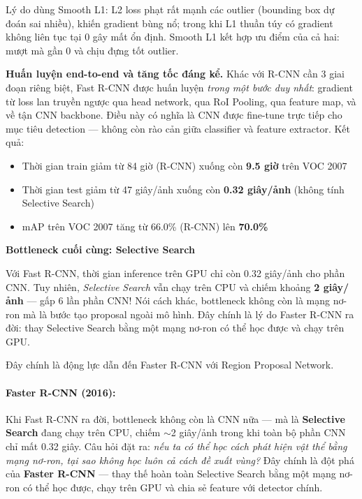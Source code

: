 Lý do dùng Smooth L1: L2 loss phạt rất mạnh các outlier (bounding box dự đoán sai nhiều), khiến gradient bùng nổ; trong khi L1 thuần túy có gradient không liên tục tại 0 gây mất ổn định. Smooth L1 kết hợp ưu điểm của cả hai: mượt mà gần 0 và chịu đựng tốt outlier.

\textbf{Huấn luyện end-to-end và tăng tốc đáng kể.}
Khác với R-CNN cần 3 giai đoạn riêng biệt, Fast R-CNN được huấn luyện \textit{trong một bước duy nhất}: gradient từ loss lan truyền ngược qua head network, qua RoI Pooling, qua feature map, và về tận CNN backbone. Điều này có nghĩa là CNN được fine-tune trực tiếp cho mục tiêu detection --- không còn rào cản giữa classifier và feature extractor. Kết quả:

\begin{itemize}
	\item Thời gian train giảm từ 84 giờ (R-CNN) xuống còn \textbf{9.5 giờ} trên VOC 2007
	\item Thời gian test giảm từ 47 giây/ảnh xuống còn \textbf{0.32 giây/ảnh} (không tính Selective Search)
	\item mAP trên VOC 2007 tăng từ 66.0\% (R-CNN) lên \textbf{70.0\%}
\end{itemize}

\begin{mdframed}[style=infobox]
\textbf{Bottleneck cuối cùng: Selective Search}

Với Fast R-CNN, thời gian inference trên GPU chỉ còn 0.32 giây/ảnh cho phần CNN. Tuy nhiên, \textit{Selective Search} vẫn chạy trên CPU và chiếm khoảng \textbf{2 giây/ảnh} --- gấp 6 lần phần CNN! Nói cách khác, bottleneck không còn là mạng nơ-ron mà là bước tạo proposal ngoài mô hình. Đây chính là lý do Faster R-CNN ra đời: thay Selective Search bằng một mạng nơ-ron có thể học được và chạy trên GPU.
\end{mdframed}

Đây chính là động lực dẫn đến Faster R-CNN với Region Proposal Network.


\paragraph{Faster R-CNN (2016):}
Khi Fast R-CNN ra đời, bottleneck không còn là CNN nữa --- mà là \textbf{Selective Search} đang chạy trên CPU, chiếm $\sim$2 giây/ảnh trong khi toàn bộ phần CNN chỉ mất 0.32 giây. Câu hỏi đặt ra: \textit{nếu ta có thể học cách phát hiện vật thể bằng mạng nơ-ron, tại sao không học luôn cả cách đề xuất vùng?} Đây chính là đột phá của \textbf{Faster R-CNN} \cite{Ren2015} — thay thế hoàn toàn Selective Search bằng một mạng nơ-ron có thể học được, chạy trên GPU và chia sẻ feature với detector chính.

